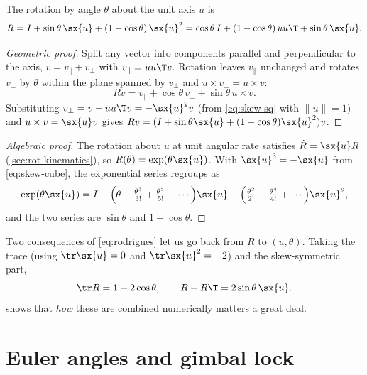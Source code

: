 \begin{theorem}
\label{thm:rodrigues}
The rotation by angle $\theta$ about the unit axis $u$ is
\begin{equation}
  R = I + \sin\theta\,\sx{u} + (1 - \cos\theta)\,\sx{u}^2
    = \cos\theta\, I + (1-\cos\theta)\,u u\T + \sin\theta\,\sx{u}.
  \label{eq:rodrigues}
\end{equation}
\end{theorem}
\begin{proof}[Geometric proof]
Split any vector into components parallel and perpendicular to the axis,
$v = v_\parallel + v_\perp$ with $v_\parallel = u u\T v$. Rotation leaves $v_\parallel$ unchanged and
rotates $v_\perp$ by $\theta$ within the plane spanned by $v_\perp$ and $u \times v_\perp = u \times v$:
\begin{equation*}
  Rv = v_\parallel + \cos\theta\, v_\perp + \sin\theta\, u \times v .
\end{equation*}
Substituting $v_\perp = v - uu\T v = -\sx{u}^2 v$ (from \eqref{eq:skew-sq} with $\|u\|=1$) and
$u \times v = \sx{u}v$ gives $Rv = (I + \sin\theta\sx{u} + (1 - \cos\theta)\sx{u}^2)v$.
\end{proof}
\begin{proof}[Algebraic proof]
The rotation about $u$ at unit angular rate satisfies $\dot R = \sx{u} R$ (\cref{sec:rot-kinematics}),
so $R(\theta) = \exp(\theta\sx{u})$. With $\sx{u}^3 = -\sx{u}$ from \eqref{eq:skew-cube}, the
exponential series regroups as
\begin{equation*}
  \exp(\theta\sx{u}) = I + \Big(\theta - \tfrac{\theta^3}{3!} + \tfrac{\theta^5}{5!} - \cdots\Big)\sx{u}
     + \Big(\tfrac{\theta^2}{2!} - \tfrac{\theta^4}{4!} + \cdots\Big)\sx{u}^2,
\end{equation*}
and the two series are $\sin\theta$ and $1 - \cos\theta$.
\end{proof}

Two consequences of \eqref{eq:rodrigues} let us go back from $R$ to $(u, \theta)$. Taking the trace
(using $\tr\sx{u} = 0$ and $\tr\sx{u}^2 = -2$) and the skew-symmetric part,
\begin{equation}
  \tr R = 1 + 2\cos\theta, \qquad R - R\T = 2\sin\theta\,\sx{u}.
  \label{eq:trace-angle}
\end{equation}
 shows that \emph{how} these are combined numerically matters a great deal.

\section{Euler angles and gimbal lock}

